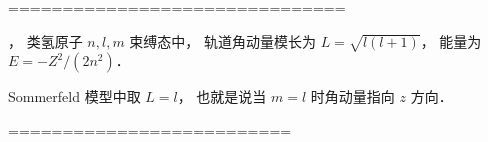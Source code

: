 ===============================

， 类氢原子 $n,l,m$ 束缚态中， 轨道角动量模长为 $L = \sqrt{l(l+1)}$， 能量为 $E = -Z^2/(2n^2)$．

Sommerfeld 模型中取 $L = l$， 也就是说当 $m = l$ 时角动量指向 $z$ 方向．

==========================

